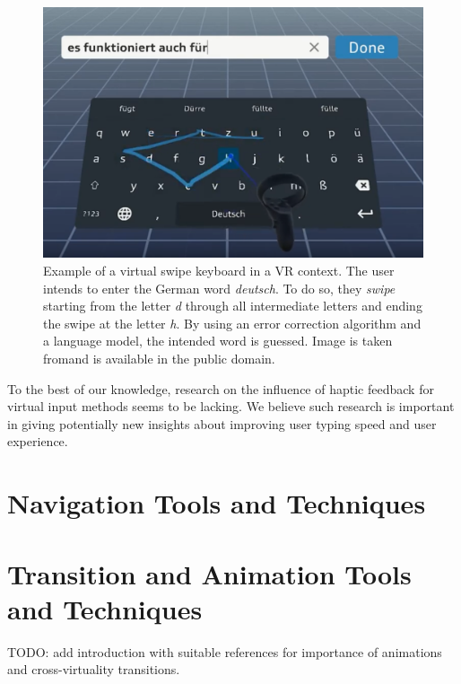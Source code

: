 \documentclass{vgtc}                          %
\begin{document}
\begin{figure}[tb]
	\centering
	\includegraphics[width=\columnwidth]{swipe_keyboard}
    \caption{Example of a virtual swipe keyboard in a VR context. The user intends to enter the German word
    \textit{deutsch}. To do so, they \textit{swipe} starting from the letter \textit{d} through all
    intermediate letters and ending the swipe at the letter \textit{h}. By using an error correction
    algorithm and a language model, the intended word is guessed. Image is taken
    from\protect\footnotemark and is available in the public domain.}
    \label{fig:swipe_keyboard}
\end{figure}


\medskip

\noindent To the best of our knowledge, research on the influence of haptic feedback for virtual input
methods seems to be lacking. We believe such research is important in giving potentially new insights about
improving user typing speed and user experience.

\section{Navigation Tools and Techniques}




\section{Transition and Animation Tools and Techniques}

TODO: add introduction with suitable references for importance of animations
and cross-virtuality transitions.
\end{document}
